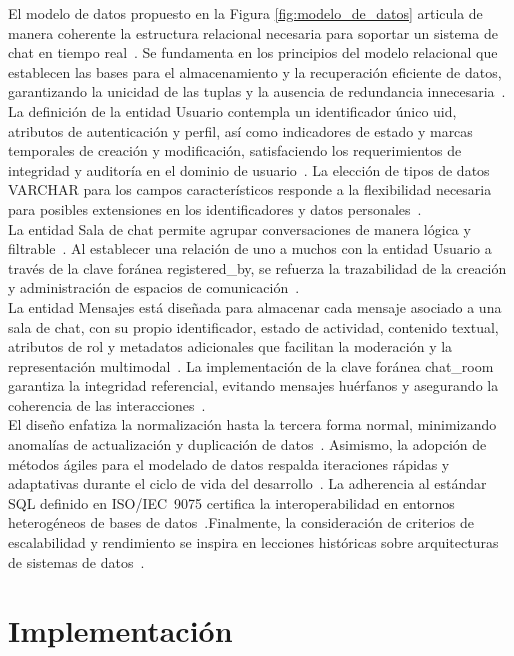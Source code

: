 El modelo de datos propuesto en la Figura \ref{fig:modelo_de_datos} articula de manera coherente la estructura relacional necesaria para soportar un sistema de chat en tiempo real~\cite{Codd1970}. Se fundamenta en los principios del modelo relacional que establecen las bases para el almacenamiento y la recuperación eficiente de datos, garantizando la unicidad de las tuplas y la ausencia de redundancia innecesaria~\cite{Silberschatz2019}.\\
La definición de la entidad Usuario contempla un identificador único uid, atributos de autenticación y perfil, así como indicadores de estado y marcas temporales de creación y modificación, satisfaciendo los requerimientos de integridad y auditoría en el dominio de usuario~\cite{ElmasriNavathe2010}. La elección de tipos de datos VARCHAR para los campos característicos responde a la flexibilidad necesaria para posibles extensiones en los identificadores y datos personales~\cite{Date2003}.\\
La entidad Sala de chat permite agrupar conversaciones de manera lógica y filtrable~\cite{ConnollyBegg2014}. Al establecer una relación de uno a muchos con la entidad Usuario a través de la clave foránea registered\_by, se refuerza la trazabilidad de la creación y administración de espacios de comunicación~\cite{Harrington2015}.\\
La entidad Mensajes está diseñada para almacenar cada mensaje asociado a una sala de chat, con su propio identificador, estado de actividad, contenido textual, atributos de rol y metadatos adicionales que facilitan la moderación y la representación multimodal~\cite{Silberschatz2019}. La implementación de la clave foránea chat\_room garantiza la integridad referencial, evitando mensajes huérfanos y asegurando la coherencia de las interacciones~\cite{IBMReferential}.\\
El diseño enfatiza la normalización hasta la tercera forma normal, minimizando anomalías de actualización y duplicación de datos~\cite{Silberschatz2019}. Asimismo, la adopción de métodos ágiles para el modelado de datos respalda iteraciones rápidas y adaptativas durante el ciclo de vida del desarrollo~\cite{Ambler2003}. La adherencia al estándar SQL definido en ISO/IEC 9075 certifica la interoperabilidad en entornos heterogéneos de bases de datos~\cite{ISO9075}.Finalmente, la consideración de criterios de escalabilidad y rendimiento se inspira en lecciones históricas sobre arquitecturas de sistemas de datos~\cite{Stonebraker2005}.


\section{Implementación}

